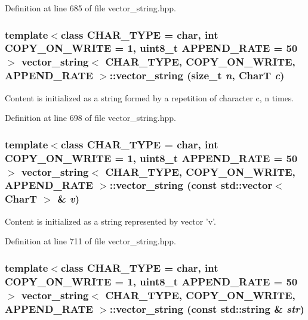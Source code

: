 Definition at line 685 of file vector\_\-string.hpp.\hypertarget{classvector__string_4ac410fc06b3114392431da64a20d898}{
\subsubsection[{vector\_\-string}]{\setlength{\rightskip}{0pt plus 5cm}template$<$class CHAR\_\-TYPE  = char, int COPY\_\-ON\_\-WRITE = 1, uint8\_\-t APPEND\_\-RATE = 50$>$ {\bf vector\_\-string}$<$ CHAR\_\-TYPE, COPY\_\-ON\_\-WRITE, APPEND\_\-RATE $>$::{\bf vector\_\-string} (size\_\-t {\em n}, \/  CharT {\em c})}}
\label{classvector__string_4ac410fc06b3114392431da64a20d898}


Content is initialized as a string formed by a repetition of character c, n times. 

Definition at line 698 of file vector\_\-string.hpp.\hypertarget{classvector__string_aa9d66b28113b5bd88d74ea674171650}{
\subsubsection[{vector\_\-string}]{\setlength{\rightskip}{0pt plus 5cm}template$<$class CHAR\_\-TYPE  = char, int COPY\_\-ON\_\-WRITE = 1, uint8\_\-t APPEND\_\-RATE = 50$>$ {\bf vector\_\-string}$<$ CHAR\_\-TYPE, COPY\_\-ON\_\-WRITE, APPEND\_\-RATE $>$::{\bf vector\_\-string} (const std::vector$<$ CharT $>$ \& {\em v})}}
\label{classvector__string_aa9d66b28113b5bd88d74ea674171650}


Content is initialized as a string represented by vector 'v'. 

Definition at line 711 of file vector\_\-string.hpp.\hypertarget{classvector__string_30b427f9cd6bf7bc011355df355f3c1a}{
\subsubsection[{vector\_\-string}]{\setlength{\rightskip}{0pt plus 5cm}template$<$class CHAR\_\-TYPE  = char, int COPY\_\-ON\_\-WRITE = 1, uint8\_\-t APPEND\_\-RATE = 50$>$ {\bf vector\_\-string}$<$ CHAR\_\-TYPE, COPY\_\-ON\_\-WRITE, APPEND\_\-RATE $>$::{\bf vector\_\-string} (const std::string \& {\em str})}}
\label{classvector__string_30b427f9cd6bf7bc011355df355f3c1a}


